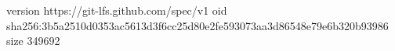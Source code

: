 version https://git-lfs.github.com/spec/v1
oid sha256:3b5a2510d0353ac5613d3f6cc25d80e2fe593073aa3d86548e79e6b320b93986
size 349692

